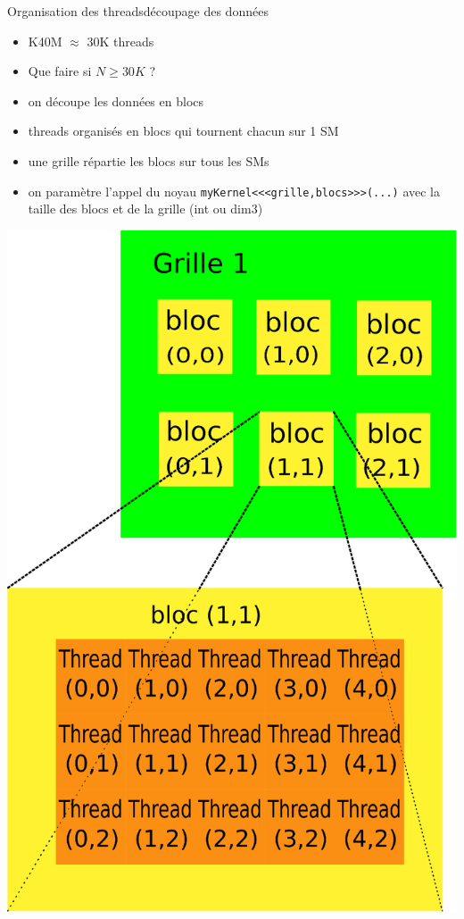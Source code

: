 \documentclass[11pt,mathserif]{beamer}
\begin{document}
\begin{frame}{Organisation des threads}{découpage des données}
 \pause
 \begin{minipage}[c]{0.59\linewidth}
  \begin{itemize}[<+->]
    \item K40M $\approx$ 30K threads 
    \item Que faire si $N \geq 30K$ ?
    \item on découpe les données en blocs
    \item threads organisés en \alert{blocs} qui tournent chacun sur 1 SM
    \item une \alert{grille} répartie les blocs sur tous les SMs
    \item on paramètre l'appel du noyau \lstinline!myKernel<<<grille,blocs>>>(...)! avec la taille des blocs et de la grille (int ou dim3)
  \end{itemize}
\end{minipage}
\begin{minipage}[c]{0.39\linewidth}
\begin{center}
  \includegraphics[width=0.8\linewidth]{fig/grille_et_blocs.eps}
\end{center}
\end{minipage}
\end{frame}
\end{document}
